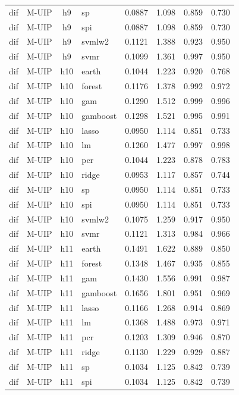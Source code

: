\begin{ThreePartTable}
\begin{longtable}[t]{llclcccc}
dif & M-UIP & h9 & sp & 0.0887 & 1.098 & 0.859 & 0.730\\
dif & M-UIP & h9 & spi & 0.0887 & 1.098 & 0.859 & 0.730\\
dif & M-UIP & h9 & svmlw2 & 0.1121 & 1.388 & 0.923 & 0.950\\
dif & M-UIP & h9 & svmr & 0.1099 & 1.361 & 0.997 & 0.950\\
\addlinespace
dif & M-UIP & h10 & earth & 0.1044 & 1.223 & 0.920 & 0.768\\
dif & M-UIP & h10 & forest & 0.1176 & 1.378 & 0.992 & 0.972\\
dif & M-UIP & h10 & gam & 0.1290 & 1.512 & 0.999 & 0.996\\
dif & M-UIP & h10 & gamboost & 0.1298 & 1.521 & 0.995 & 0.991\\
dif & M-UIP & h10 & lasso & 0.0950 & 1.114 & 0.851 & 0.733\\
dif & M-UIP & h10 & lm & 0.1260 & 1.477 & 0.997 & 0.998\\
dif & M-UIP & h10 & pcr & 0.1044 & 1.223 & 0.878 & 0.783\\
dif & M-UIP & h10 & ridge & 0.0953 & 1.117 & 0.857 & 0.744\\
dif & M-UIP & h10 & sp & 0.0950 & 1.114 & 0.851 & 0.733\\
dif & M-UIP & h10 & spi & 0.0950 & 1.114 & 0.851 & 0.733\\
dif & M-UIP & h10 & svmlw2 & 0.1075 & 1.259 & 0.917 & 0.950\\
dif & M-UIP & h10 & svmr & 0.1121 & 1.313 & 0.984 & 0.966\\
\addlinespace
dif & M-UIP & h11 & earth & 0.1491 & 1.622 & 0.889 & 0.850\\
dif & M-UIP & h11 & forest & 0.1348 & 1.467 & 0.935 & 0.855\\
dif & M-UIP & h11 & gam & 0.1430 & 1.556 & 0.991 & 0.987\\
dif & M-UIP & h11 & gamboost & 0.1656 & 1.801 & 0.951 & 0.969\\
dif & M-UIP & h11 & lasso & 0.1166 & 1.268 & 0.914 & 0.869\\
dif & M-UIP & h11 & lm & 0.1368 & 1.488 & 0.973 & 0.971\\
dif & M-UIP & h11 & pcr & 0.1203 & 1.309 & 0.946 & 0.870\\
dif & M-UIP & h11 & ridge & 0.1130 & 1.229 & 0.929 & 0.887\\
dif & M-UIP & h11 & sp & 0.1034 & 1.125 & 0.842 & 0.739\\
dif & M-UIP & h11 & spi & 0.1034 & 1.125 & 0.842 & 0.739\\

\end{longtable}
\end{ThreePartTable}
